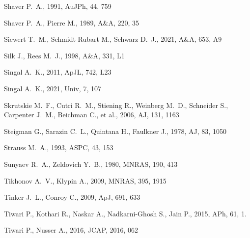 \documentclass[fleqn,usenatbib]{mnras}
\begin{document}
\begin{thebibliography}{}
 Shaver P.~A., 1991, AuJPh, 44, 759

 Shaver P.~A., Pierre M., 1989, A\&A, 220, 35

 Siewert T.~M., Schmidt-Rubart M., Schwarz D.~J., 2021, A\&A, 653, A9

 Silk J., Rees M.~J., 1998, A\&A, 331, L1 %

 Singal A.~K., 2011, ApJL, 742, L23

 Singal A.~K., 2021, Univ, 7, 107

 Skrutskie M.~F., Cutri R.~M., Stiening R., Weinberg M.~D., Schneider S., Carpenter J.~M., Beichman C., et al., 2006, AJ, 131, 1163


 Steigman G., Sarazin C.~L., Quintana H., Faulkner J., 1978, AJ, 83, 1050

 Strauss M.~A., 1993, ASPC, 43, 153

 Sunyaev R.~A., Zeldovich Y.~B., 1980, MNRAS, 190, 413

 Tikhonov A.~V., Klypin A., 2009, MNRAS, 395, 1915

 Tinker J.~L., Conroy C., 2009, ApJ, 691, 633

 Tiwari P., Kothari R., Naskar A., Nadkarni-Ghosh S., Jain P., 2015, APh, 61, 1.

 Tiwari P., Nusser A., 2016, JCAP, 2016, 062


\end{thebibliography}
\end{document}
